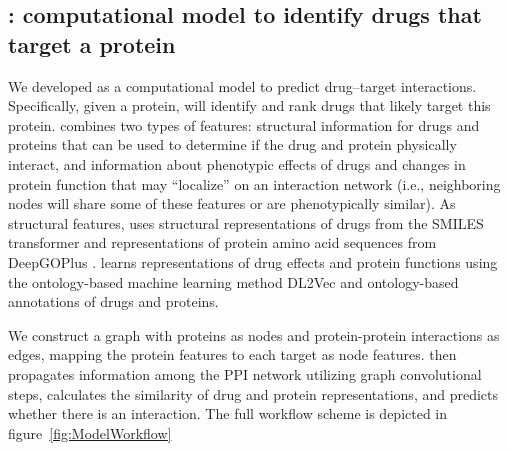 \documentclass{bioinfo}
\renewcommand{\cite}{\citep}
\begin{document}
\subsection{\name: computational model to identify drugs that target a
  protein}


We developed \name as a computational model to predict drug--target
interactions. Specifically, given a protein, \name will identify and
rank drugs that likely target this protein. \name combines two types
of features: structural information for drugs and proteins that can be
used to determine if the drug and protein physically interact, and
information about phenotypic effects of drugs and changes in protein
function that may ``localize'' on an interaction network (i.e.,
neighboring nodes will share some of these features or are
phenotypically similar).  As structural features, \name uses
structural representations of drugs from the SMILES transformer
\cite{SmilesTransformer} and representations of protein amino acid
sequences from DeepGOPlus \cite{DeepGoPlus}.  \name learns
representations of drug effects and protein functions using the
ontology-based machine learning method DL2Vec \cite{DL2vec2020} and
ontology-based annotations of drugs and proteins.

We construct a graph with proteins as nodes and protein-protein
interactions as edges, mapping the protein features to each target as
node features. \name then propagates information among the PPI network
utilizing graph convolutional steps, calculates the similarity of drug
and protein representations, and predicts whether there is an
interaction. The full workflow scheme is depicted in
figure~\ref{fig:ModelWorkflow}

\end{document}
